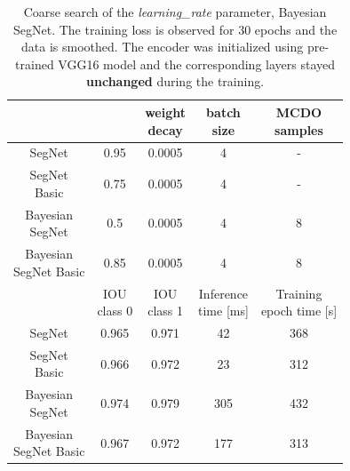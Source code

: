 \renewcommand{\arraystretch}{1.1}
\begin{table}[h]
	\centering	
	\begin{tabular}{|c|c|c|c|c|}
		\hline
		\thead{Architecture} & \thead{base\_lr} & \thead{weight \\ decay} & \thead{batch \\ size} & \thead{MCDO \\ samples}\\		
		\hline
		SegNet & 0.95 & 0.0005 & 4 & - \\
		\hline
		\makecell{SegNet \\ Basic} & 0.75 & 0.0005 & 4 & - \\
		\hline
		\makecell{Bayesian \\ SegNet} & 0.5 & 0.0005 & 4 & 8 \\	
		\hline
		\makecell{Bayesian \\ SegNet Basic} & 0.85 & 0.0005 & 4 & 8 \\
		\hline
		& \thead{IOU \\ class 0} & \thead{IOU \\ class 1} & \thead{Inference \\ time [ms] } & \thead{Training \\ epoch time [s] }\\		
		\hline	
		SegNet & 0.965 & 0.971 & 42 & 368 \\	
		\hline	
		\makecell{SegNet \\ Basic} & 0.966 & 0.972 & 23 & 312 \\	
		\hline	
		\makecell{Bayesian \\ SegNet} & 0.974 & 0.979 & 305 & 432 \\	
		\hline	
		\makecell{Bayesian \\ SegNet Basic} & 0.967 & 0.972 & 177 & 313 \\
		\hline
	\end{tabular}
	\vspace{10mm}
	\caption{Coarse search of the \textit{learning\_rate} parameter, Bayesian SegNet. The training loss is observed for 30 epochs and the data is smoothed. The encoder was initialized using pre-trained VGG16 model and the corresponding layers stayed \textbf{unchanged} during the training.} 
	\label{tabulka}
\end{table}

